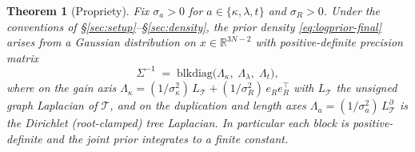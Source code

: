 \documentclass[11pt]{article}
\newcommand{\R}{\mathbb{R}}
\newcommand{\Tree}{\mathcal{T}}
\newcommand{\troot}{R}
\newcommand{\rate}{\kappa}             %
\newcommand{\dup}{\lambda}             %
\newcommand{\edgelen}{t}               %
\newtheorem{theorem}{Theorem}
\theoremstyle{definition}
\begin{document}
\begin{theorem}[Propriety]\label{thm:proper}
Fix $\sigma_a > 0$ for $a \in \{\rate, \dup, \edgelen\}$ and
$\sigma_\troot > 0$. Under the conventions of
\S\ref{sec:setup}--\S\ref{sec:density}, the prior density
\eqref{eq:logprior-final} arises from a Gaussian distribution on
$x \in \R^{3N-2}$ with positive-definite precision matrix
\begin{equation}
\Sigma^{-1} \;=\; \mathrm{blkdiag}\bigl(\Lambda_\rate,\;
                                       \Lambda_\dup,\;
                                       \Lambda_\edgelen\bigr),
\label{eq:precision-block}
\end{equation}
where on the gain axis $\Lambda_\rate = (1/\sigma_\rate^2)\,L_\Tree
+ (1/\sigma_\troot^2)\,e_\troot e_\troot^\top$ with $L_\Tree$ the
unsigned graph Laplacian of $\Tree$, and on the duplication and
length axes $\Lambda_a = (1/\sigma_a^2)\,L^\partial_\Tree$ is the
\emph{Dirichlet} (root-clamped) tree Laplacian. In particular each
block is positive-definite and the joint prior integrates to a
finite constant.
\end{theorem}
\end{document}
